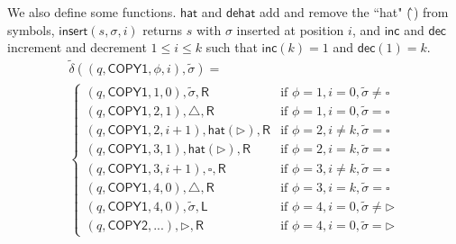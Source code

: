 \documentclass[12pt]{article}
\begin{document}
\noindent
We also define some functions. $\textsf{hat}$ and $\textsf{dehat}$ add and remove the ``hat" (\^\,) from symbols, $\textsf{insert}(s, \sigma, i)$ returns $s$ with $\sigma$ inserted at position $i$, and $\textsf{inc}$ and $\textsf{dec}$ increment and decrement $1 \leq i \leq k$ such that $\textsf{inc}(k) = 1$ and $\textsf{dec}(1) = k$.
\begin{multline*}
\tilde{\delta}((q, \textsf{COPY1}, \phi, i), \tilde{\sigma}) = \\
\begin{cases}
(q, \textsf{COPY1}, 1, 0), \tilde{\sigma}, \textsf{R} & \text{if } \phi = 1, i = 0, \tilde{\sigma} \neq \square \\
(q, \textsf{COPY1}, 2, 1), \triangle, \textsf{R} & \text{if } \phi = 1, i = 0, \tilde{\sigma} = \square \\
(q, \textsf{COPY1}, 2, i+1), \textsf{hat}(\triangleright), \textsf{R} & \text{if } \phi = 2, i \neq k, \tilde{\sigma} = \square \\
(q, \textsf{COPY1}, 3, 1), \textsf{hat}(\triangleright), \textsf{R} & \text{if } \phi = 2, i = k, \tilde{\sigma} = \square \\
(q, \textsf{COPY1}, 3, i+1), \square, \textsf{R} & \text{if } \phi = 3, i \neq k, \tilde{\sigma} = \square \\
(q, \textsf{COPY1}, 4, 0), \triangle, \textsf{R} & \text{if } \phi = 3, i = k, \tilde{\sigma} = \square \\
(q, \textsf{COPY1}, 4, 0), \tilde{\sigma}, \textsf{L} & \text{if } \phi = 4, i = 0, \tilde{\sigma} \neq \triangleright \\
(q, \textsf{COPY2}, ...), \triangleright, \textsf{R} & \text{if } \phi = 4, i = 0, \tilde{\sigma} = \triangleright
\end{cases}
\end{multline*}
\end{document}
